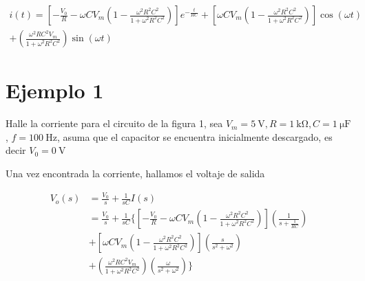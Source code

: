 \documentclass{article}
\begin{document}
\begin{tcolorbox}[colback=red!5!white,colframe=red!75!black,arc=0mm,boxrule=0mm,width=(\linewidth+0.5cm)]
\begin{equation}\begin{split}
		i(t) = \left[ -\frac{V_0}{R} - \omega CV_m \left( 1 - \frac{\omega^2 R^2 C^2}{1 + \omega^2 R^2 C^2}  \right) \right] e^{-\frac{t}{RC}}  + \left[ \omega C V_m \left( 1 - \frac{\omega^2 R^2 C^2}{1 + \omega^2 R^2 C^2}  \right) \right] \cos (\omega t) \\
		+ \left( \frac{\omega^2 R C^2 V_m}{1 + \omega^2 R^2 C^2} \right) \sin (\omega t)
\end{split}\end{equation}
\end{tcolorbox}

\section*{Ejemplo 1}
Halle la corriente para el circuito de la figura 1, sea $V_m = \qty{5}{\volt}, R = \qty{1}{\kilo \ohm}, C = \qty{1}{\micro \farad}$, $f = \qty{100}{\hertz}$, asuma que el capacitor se encuentra inicialmente descargado, es decir $V_0 = \qty{0}{\volt}$

\begin{figure}[H]
	\centering
\end{figure}

\noindent Una vez encontrada la corriente, hallamos el voltaje de salida

\begin{equation}\begin{split}
	V_o(s) &= \frac{V_0}{s} + \frac{1}{sC}I(s) \nonumber \\
	&= \frac{V_0}{s} + \frac{1}{sC}  \bigg \{ \left[ -\frac{V_0}{R} - \omega CV_m \left( 1 - \frac{\omega^2 R^2 C^2}{1 + \omega^2 R^2 C^2}  \right) \right]  \left( \frac{1}{s + \frac{1}{RC}} \right)  \\&+ \left[ \omega C V_m \left( 1 - \frac{\omega^2 R^2 C^2}{1 + \omega^2 R^2 C^2}  \right) \right]  \left( \frac{s}{s^2  + \omega^2} \right) \\ &+  \left( \frac{\omega^2 R C^2 V_m}{1 + \omega^2 R^2 C^2} \right) \left( \frac{\omega}{s^2 + \omega ^2} \right) \bigg \}
\end{split}\end{equation}
\end{document}

